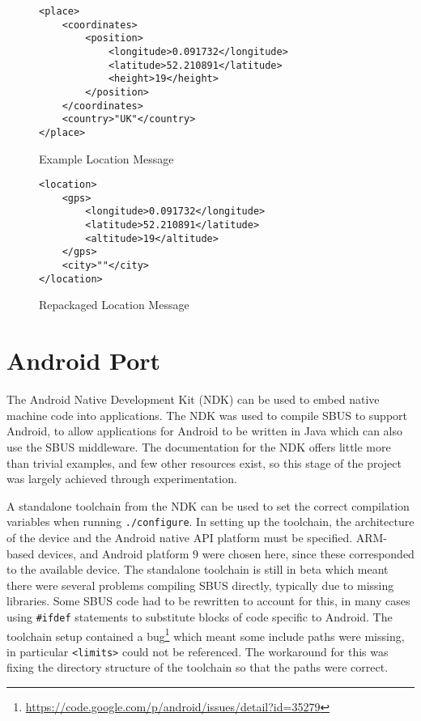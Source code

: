 \documentclass[12pt,twoside,notitlepage]{report}
\begin{document}
\begin{figure}
\begin{lstlisting}[style=xml]
<place>
	<coordinates>
		<position>
			<longitude>0.091732</longitude>
			<latitude>52.210891</latitude>
			<height>19</height>
		</position>
	</coordinates>
	<country>"UK"</country>
</place>
\end{lstlisting}
\caption{Example Location Message}
\label{fig:locationmessage}
\end{figure}

\begin{figure}
\begin{lstlisting}[style=xml]
<location>
	<gps>
		<longitude>0.091732</longitude>
		<latitude>52.210891</latitude>
		<altitude>19</altitude>
	</gps>
	<city>""</city>
</location>
\end{lstlisting}
\caption{Repackaged Location Message}
\label{fig:locationmessagerepack}
\end{figure}

\section{Android Port}

The Android Native Development Kit (NDK) can be used to embed native machine code into applications. 
The NDK was used to compile SBUS to support Android, to allow applications for Android to be written in Java which can also use the SBUS middleware. 
The documentation for the NDK offers little more than trivial examples, and few other resources exist, so this stage of the project was largely achieved through experimentation. 

A standalone toolchain from the NDK can be used to set the correct compilation variables when running {\tt ./configure}. 
In setting up the toolchain, the architecture of the device and the Android native API platform must be specified. 
ARM-based devices, and Android platform 9 were chosen here, since these corresponded to the available device. 
The standalone toolchain is still in beta which meant there were several problems compiling SBUS directly, typically due to missing libraries. 
Some SBUS code had to be rewritten to account for this, in many cases using {\tt \#ifdef} statements to substitute blocks of code specific to Android. 
The toolchain setup contained a bug\footnote{\url{https://code.google.com/p/android/issues/detail?id=35279}} which meant some include paths were missing, in particular {\tt <limits>} could not be referenced. 
The workaround for this was fixing the directory structure of the toolchain so that the paths were correct. 
\end{document}
